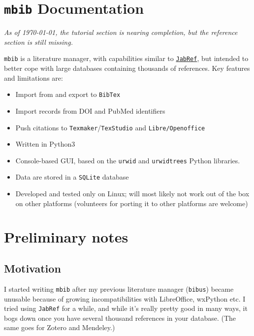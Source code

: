 \documentclass[10pt]{article}
\newcommand*{\mbib}{\texttt{mbib}\xspace}
\newcommand*{\jabref}{\texttt{JabRef}\xspace}
\newcommand*{\loo}{\texttt{Libre\-/Open\-office}\xspace}
\newcommand*{\bibtex}{\texttt{BibTex}\xspace}
\newcommand*{\sqlite}{\texttt{SQLite}\xspace}
\begin{document}
\section*{\mbib Documentation}

\emph{As of \today, the tutorial section is nearing completion, but the reference section is still missing.}

\bigskip

\noindent \mbib is a literature manager, with capabilities similar to \href{http://www.jabref.org}{\jabref}, but intended to better cope with large databases containing thousands of references.  Key features and limitations are:

\begin{itemize}
\item Import from and export to \bibtex  

\item Import records from DOI and PubMed identifiers

\item Push citations to \texttt{Texmaker}/\texttt{TexStudio} and \loo 

\item Written in Python3

\item Console-based GUI, based on the \texttt{urwid} and
\texttt{urwidtrees} Python libraries. 

\item Data are stored in a \sqlite database

\item Developed and tested only on Linux; will most likely not work out of the box on other platforms (volunteers for porting it to other platforms are welcome)

\end{itemize}

\section{Preliminary notes}

\subsection{Motivation}

I started writing \mbib after my previous literature manager (\texttt{bibus}) became unusable because of growing incompatibilities with LibreOffice, wxPython etc. I tried using \jabref for a while, and while it's really pretty good in many ways, it bogs down once you have several thousand references in your database. (The same goes for Zotero and Mendeley.)
\end{document}
